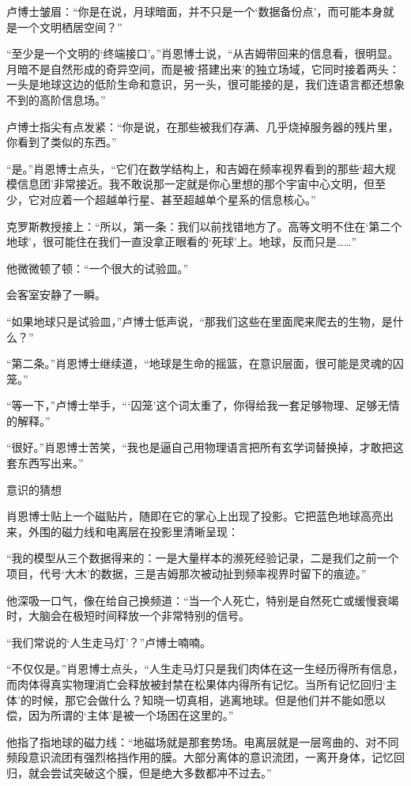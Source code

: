 卢博士皱眉：“你是在说，月球暗面，并不只是一个‘数据备份点’，而可能本身就是一个文明栖居空间？”

“至少是一个文明的‘终端接口’。”肖恩博士说，“从吉姆带回来的信息看，很明显。月暗不是自然形成的奇异空间，而是被‘搭建出来’的独立场域，它同时接着两头：一头是地球这边的低阶生命和意识，另一头，很可能接的是，我们连语言都还想象不到的高阶信息场。”

卢博士指尖有点发紧：“你是说，在那些被我们存满、几乎烧掉服务器的残片里，你看到了类似的东西。”

“是。”肖恩博士点头，“它们在数学结构上，和吉姆在频率视界看到的那些‘超大规模信息团’非常接近。我不敢说那一定就是你心里想的那个宇宙中心文明，但至少，它对应着一个超越单行星、甚至超越单个星系的信息核心。”

克罗斯教授接上：“所以，第一条：我们以前找错地方了。高等文明不住在‘第二个地球’，很可能住在我们一直没拿正眼看的‘死球’上。地球，反而只是……”

他微微顿了顿：“一个很大的试验皿。”

会客室安静了一瞬。

“如果地球只是试验皿，”卢博士低声说，“那我们这些在里面爬来爬去的生物，是什么？”

“第二条。”肖恩博士继续道，“地球是生命的摇篮，在意识层面，很可能是灵魂的囚笼。”

“等一下，”卢博士举手，“‘囚笼’这个词太重了，你得给我一套足够物理、足够无情的解释。”

“很好。”肖恩博士苦笑，“我也是逼自己用物理语言把所有玄学词替换掉，才敢把这套东西写出来。”

意识的猜想

肖恩博士贴上一个磁贴片，随即在它的掌心上出现了投影。它把蓝色地球高亮出来，外围的磁力线和电离层在投影里清晰呈现：

“我的模型从三个数据得来的：一是大量样本的濒死经验记录，二是我们之前一个项目，代号‘大木’的数据，三是吉姆那次被动扯到频率视界时留下的痕迹。”

他深吸一口气，像在给自己换频道：“当一个人死亡，特别是自然死亡或缓慢衰竭时，大脑会在极短时间释放一个非常特别的信号。

“我们常说的‘人生走马灯’？”卢博士喃喃。

“不仅仅是。”肖恩博士点头，“人生走马灯只是我们肉体在这一生经历得所有信息，而肉体得真实物理消亡会释放被封禁在松果体内得所有记忆。当所有记忆回归‘主体’的时候，那它会做什么？知晓一切真相，逃离地球。但是他们并不能如愿以偿，因为所谓的‘主体’是被一个场困在这里的。”

他指了指地球的磁力线：“地磁场就是那套势场。电离层就是一层弯曲的、对不同频段意识流团有强烈格挡作用的膜。大部分离体的意识流团，一离开身体，记忆回归，就会尝试突破这个膜，但是绝大多数都冲不过去。”

